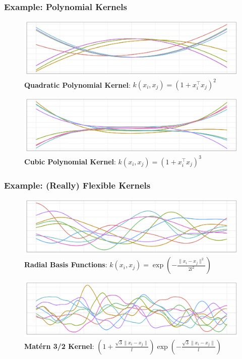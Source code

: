 \documentclass{beamer}
\begin{document}
\begin{frame}
\frametitle{Example: Polynomial Kernels}
\begin{figure}
\centering
\includegraphics[width=.7\linewidth]{./plot/quad} 
\caption{\textbf{Quadratic Polynomial Kernel}: $k(x_i, x_j)=(1+x_i^\top x_j)^2$}
\end{figure}

\begin{figure}
\centering
\includegraphics[width=.7\linewidth]{./plot/cubic} 
\caption{\textbf{Cubic Polynomial Kernel}: $k(x_i, x_j)=(1+x_i^\top x_j)^3$}
\end{figure}
\end{frame}

\begin{frame}
\frametitle{Example: (Really) Flexible Kernels}
\begin{figure}
\centering
\includegraphics[width=.7\linewidth]{./plot/rbf2} 
\caption{\textbf{Radial Basis Functions}: $k(x_i, x_j)=\exp(-\frac{\lVert x_i - x_j \rVert^2}{2l^2})$}
\end{figure}

\begin{figure}
\centering
\includegraphics[width=.7\linewidth]{./plot/mat3_5} 
\caption{\textbf{Mat\'{e}rn 3/2 Kernel}: $(1+\frac{\sqrt{3} \lVert x_i - x_j \rVert}{l})\exp(-\frac{\sqrt{3} \lVert x_i - x_j \rVert}{l})$}
\end{figure}

\end{frame}
\end{document}
